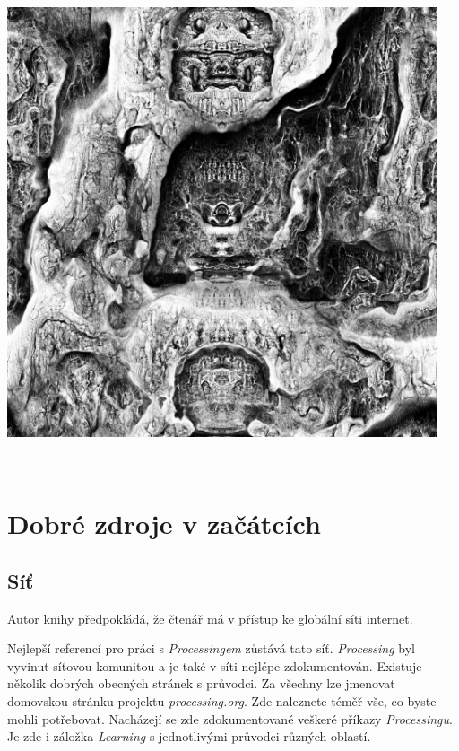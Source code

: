 \documentclass[10pt,twoside=true,open=right,cleardoublepage=empty,chapterprefix=true]{scrbook}
\newcommand{\oddil}[1]{\section{#1}\index{#1}\label{#1}}
\begin{document}
\begin{center}
\includegraphics[width = 0.95\textwidth]{imgs/turingpattern.jpg}
\end{center}

\ 







 







\chapter{Dobré zdroje v začátcích}

\oddil{Síť}

Autor knihy předpokládá, že čtenář má v přístup ke globální síti internet.

Nejlepší referencí pro práci s {\em Processingem} zůstává tato síť. {\em Processing} byl vyvinut síťovou komunitou a je také v síti nejlépe zdokumentován. Existuje několik dobrých obecných stránek s průvodci. Za všechny lze jmenovat domovskou stránku projektu {\em processing.org}. Zde naleznete téměř vše, co byste mohli potřebovat. Nacházejí se zde zdokumentované veškeré příkazy {\em Processingu}. Je zde i záložka {\em Learning} s jednotlivými průvodci různých oblastí.
\end{document}
